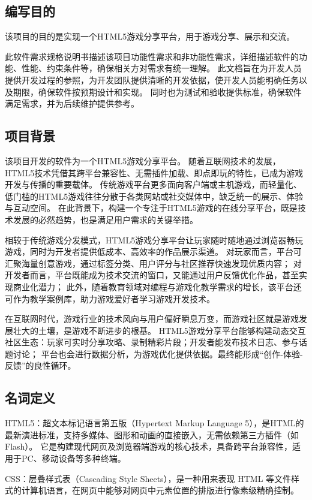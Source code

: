 \documentclass[12pt]{ctexart} %
\begin{document}
\subsection{编写目的}
该项目的目的是实现一个HTML5游戏分享平台，用于游戏分享、展示和交流。

此软件需求规格说明书描述该项目功能性需求和非功能性需求，详细描述软件的功能、性能、约束条件等，确保相关方对需求有统一理解。
此文档旨在为开发人员提供开发过程的参照，为开发团队提供清晰的开发依据，使开发人员能明确任务以及期限，确保软件按预期设计和实现。
同时也为测试和验收提供标准，确保软件满足需求，并为后续维护提供参考。

\subsection{项目背景}
该项目开发的软件为一个HTML5游戏分享平台。
随着互联网技术的发展，HTML5技术凭借其跨平台兼容性、无需插件加载、即点即玩的特性，已成为游戏开发与传播的重要载体。
传统游戏平台更多面向客户端或主机游戏，而轻量化、低门槛的HTML5游戏往往分散于各类网站或社交媒体中，缺乏统一的展示、体验与互动空间。
在此背景下，构建一个专注于HTML5游戏的在线分享平台，既是技术发展的必然趋势，也是满足用户需求的关键举措。

相较于传统游戏分发模式，HTML5游戏分享平台让玩家随时随地通过浏览器畅玩游戏，同时为开发者提供低成本、高效率的作品展示渠道。
对玩家而言，平台可汇聚海量创意游戏，通过标签分类、用户评分与社区推荐快速发现优质内容；
对开发者而言，平台既能成为技术交流的窗口，又能通过用户反馈优化作品，甚至实现商业化潜力；
此外，随着教育领域对编程与游戏化教学需求的增长，该平台还可作为教学案例库，助力游戏爱好者学习游戏开发技术。

在互联网时代，游戏行业的技术风向与用户偏好瞬息万变，而游戏社区就是游戏发展壮大的土壤，是游戏不断进步的根基。
HTML5游戏分享平台能够构建动态交互社区生态：玩家可实时分享攻略、录制精彩片段；开发者能发布技术日志、参与话题讨论；
平台也会进行数据分析，为游戏优化提供依据。最终能形成“创作-体验-反馈”的良性循环。


\subsection{名词定义}
HTML5：超文本标记语言第五版（Hypertext Markup Language 5），是HTML的最新演进标准，支持多媒体、图形和动画的直接嵌入，无需依赖第三方插件（如Flash）。
它是构建现代网页及浏览器端游戏的核心技术，具备跨平台兼容性，适用于PC、移动设备等多种终端。

CSS：层叠样式表（Cascading Style Sheets），是一种用来表现 HTML 等文件样式的计算机语言，在网页中能够对网页中元素位置的排版进行像素级精确控制。
\end{document}
